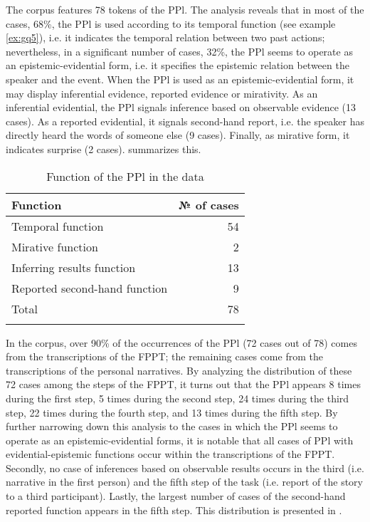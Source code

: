 \documentclass[output=paper]{langsci/langscibook}
\begin{document}
The corpus features 78 tokens of the PPl. The analysis reveals that in most of the cases, 68\%, the PPl is used according to its temporal function (see example \ref{ex:gq5}), i.e. it indicates the temporal relation between two past actions; nevertheless, in a significant number of cases, 32\%, the PPl seems to operate as an epistemic-evidential form, i.e. it specifies the epistemic relation between the speaker and the event. When the PPl is used as an epistemic-evidential form, it may display inferential evidence, reported evidence or mirativity. As an inferential evidential, the PPl signals inference based on observable evidence (13 cases). As a reported evidential, it signals second-hand report, i.e. the speaker has directly heard the words of someone else (9 cases). Finally, as mirative form, it indicates surprise (2 cases).  summarizes this.

\begin{table}
\centering
\begin{tabularx}{.75\textwidth}{Xr}
\lsptoprule
\textbf{Function} & \textbf{№ of cases}\\
\midrule
Temporal function & 54\\
Mirative function & 2\\
Inferring results function & 13\\
Reported second-hand function & 9\\
\hline
Total & 78\\
\lspbottomrule
\end{tabularx}
\caption{Function of the PPl in the data}\label{tab:gq1} 
\end{table}

In the corpus, over 90\% of the occurrences of the PPl (72 cases out of 78) comes from the transcriptions of the FPPT; the remaining cases come from the transcriptions of the personal narratives. By analyzing the distribution of these 72 cases among the steps of the FPPT, it turns out that the PPl appears 8 times during the first step, 5 times during the second step, 24 times during the third step, 22 times during the fourth step, and 13 times during the fifth step. By further narrowing down this analysis to the cases in which the PPl seems to operate as an epistemic-evidential forms, it is notable that all cases of PPl with evidential-epistemic functions occur within the transcriptions of the FPPT. Secondly, no case of inferences based on observable results occurs in the third (i.e. narrative in the first person) and the fifth step of the task (i.e. report of the story to a third participant). Lastly, the largest number of cases of the second-hand reported function appears in the fifth step. This distribution is presented in . 
\end{document}
